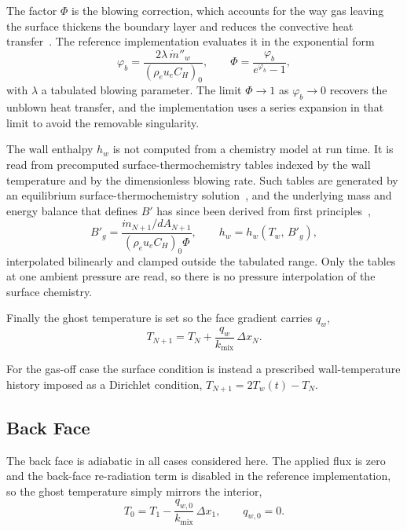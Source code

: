 \documentclass[11pt]{report}
\begin{document}
The factor $\Phi$ is the blowing correction, which accounts for the way gas
leaving the surface thickens the boundary layer and reduces the convective heat
transfer~\cite{moyer1968cma}. The reference implementation evaluates it in the
exponential form
\begin{equation}
\varphi_b = \frac{2\lambda\, \dot m''_w}{\left(\rho_e u_e C_H\right)_0},
\qquad
\Phi = \frac{\varphi_b}{e^{\varphi_b} - 1} ,
\label{eq:blowing}
\end{equation}
with $\lambda$ a tabulated blowing parameter. The limit $\Phi \to 1$ as
$\varphi_b \to 0$ recovers the unblown heat transfer, and the implementation uses
a series expansion in that limit to avoid the removable singularity.

The wall enthalpy $h_w$ is not computed from a chemistry model at run time. It is
read from precomputed surface-thermochemistry tables indexed by the wall
temperature and by the dimensionless blowing rate. Such tables are generated by an
equilibrium surface-thermochemistry solution~\cite{kendall1968ace}, and the
underlying mass and energy balance that defines $B'$ has since been derived from
first principles~\cite{padovan2024bprime},
\begin{equation}
B'_g = \frac{\dot m_{N+1} / dA_{N+1}}{\left(\rho_e u_e C_H\right)_0 \Phi},
\qquad
h_w = h_w\!\left(T_w,\, B'_g\right),
\label{eq:bprime}
\end{equation}
interpolated bilinearly and clamped outside the tabulated range. Only the
tables at one ambient pressure are read, so there is no pressure interpolation of
the surface chemistry.

Finally the ghost temperature is set so the face gradient carries $q_w$,
\begin{equation}
T_{N+1} = T_N + \frac{q_w}{k_{\mathrm{mix}}}\, \Delta x_N .
\end{equation}

For the gas-off case the surface condition is instead a prescribed wall-temperature
history imposed as a Dirichlet condition, $T_{N+1} = 2 T_w(t) - T_N$.

\subsection{Back Face}

The back face is adiabatic in all cases considered here. The applied flux is zero
and the back-face re-radiation term is disabled in the reference implementation,
so the ghost temperature simply mirrors the interior,
\begin{equation}
T_0 = T_1 - \frac{q_{w,0}}{k_{\mathrm{mix}}}\, \Delta x_1, \qquad q_{w,0} = 0 .
\end{equation}
\end{document}
